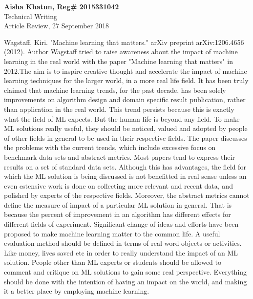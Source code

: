 \documentclass[a4paper,12pt]{article}
\begin{document}
\noindent
\textbf{Aisha Khatun, Reg\# 2015331042}\\
Technical Writing\\
Article Review, 27 September 2018\\
\newline


\noindent
\newline
\newline
Wagstaff, Kiri. "Machine learning that matters." arXiv preprint arXiv:1206.4656 (2012).
\newline
\indent
Author Wagstaff tried to raise awareness about the impact of machine learning in the real world with the paper "Machine learning that matters" in 2012.The aim  is to inspire creative thought and accelerate the impact of machine learning techniques for the larger world, in a more real life field. It has been truly claimed that machine learning trends, for the past decade, has been solely improvements on algorithm design and domain specific result publication, rather than application in the real world.
This trend persists because this is exactly what the field of ML expects. But the human life is beyond any field. To make ML solutions really useful, they should be noticed, valued and adopted by people of other fields in general to be used in their respective fields.
\newline
\indent
The paper discusses the problems with the current trends, which include excessive focus on benchmark data sets and abstract metrics. Most papers tend to express their results on a set of standard data sets. Although this has advantages, the field for which the ML solution is being discussed is not benefitted in real sense unless an even estensive work is done on collecting more relevant and recent data, and polished by experts of the respective fields. Moreover, the abstract metrics cannot define the measure of impact of a particular ML solution in general. That is because the percent of improvement in an algorithm has different effects for different fields of experiment.
\newline
\indent
Significant change of ideas and efforts have been proposed to make machine learning matter to the common life. A useful evaluation method should be defined in terms of real word objects or activities. Like money, lives saved etc in order to really understand the impact of an ML solution. People other than ML experts or students should be allowed to comment and critique on ML solutions to gain some real perspective. Everything should be done with the intention of having an impact on the world, and making it a better place by employing machine learning.
\end{document}
